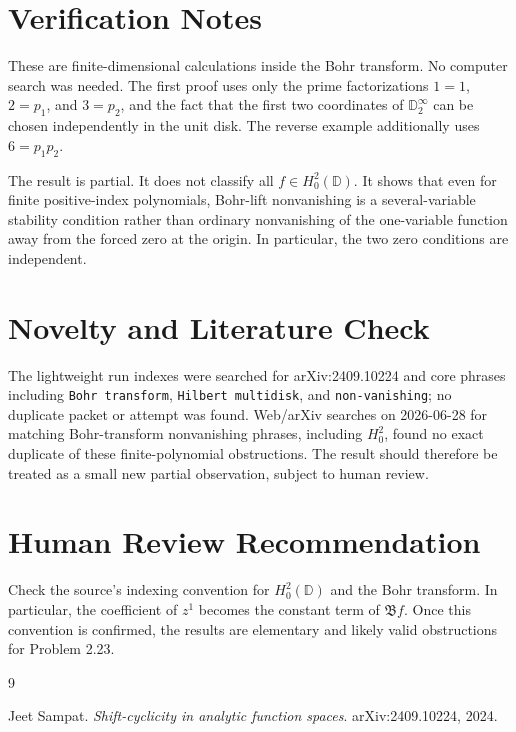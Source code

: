 \documentclass[11pt]{article}
\newcommand{\D}{\mathbb D}
\begin{document}
\section*{Verification Notes}

These are finite-dimensional calculations inside the Bohr transform.  No
computer search was needed.  The first proof uses only the prime
factorizations \(1=1\), \(2=p_1\), and \(3=p_2\), and the fact that the first
two coordinates of \(\D^\infty_2\) can be chosen independently in the unit
disk.  The reverse example additionally uses \(6=p_1p_2\).

The result is partial.  It does not classify all \(f\in H^2_0(\D)\).  It shows
that even for finite positive-index polynomials, Bohr-lift nonvanishing is a
several-variable stability condition rather than ordinary nonvanishing of the
one-variable function away from the forced zero at the origin.  In particular,
the two zero conditions are independent.

\section*{Novelty and Literature Check}

The lightweight run indexes were searched for arXiv:2409.10224 and core
phrases including \texttt{Bohr transform}, \texttt{Hilbert multidisk}, and
\texttt{non-vanishing}; no duplicate packet or attempt was found.  Web/arXiv
searches on 2026-06-28 for matching Bohr-transform nonvanishing phrases,
including \(H^2_0\), found no exact duplicate of these finite-polynomial
obstructions.  The result should therefore be treated as a small new partial
observation, subject to human review.

\section*{Human Review Recommendation}

Check the source's indexing convention for \(H^2_0(\D)\) and the Bohr
transform.  In particular, the coefficient of \(z^1\) becomes the constant
term of \(\mathfrak Bf\).  Once this convention is confirmed, the results are
elementary and likely valid obstructions for Problem 2.23.

\begin{thebibliography}{9}

Jeet Sampat.
\newblock \emph{Shift-cyclicity in analytic function spaces}.
\newblock arXiv:2409.10224, 2024.

\end{thebibliography}
\end{document}
